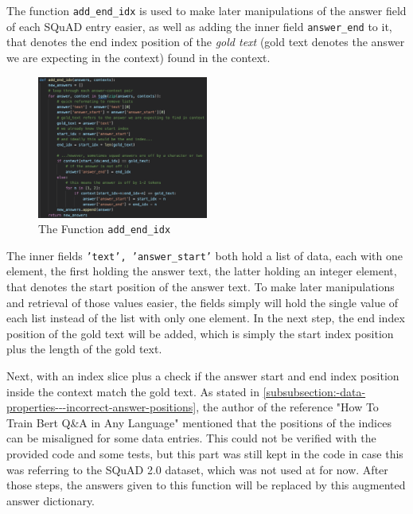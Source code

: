                 The function \texttt{add\_end\_idx} is used to make later manipulations of the answer field of each SQuAD entry easier, as well as adding the inner field \texttt{answer\_end} to it, that denotes the end index position of the \emph{gold text} (gold text denotes the answer we are expecting in the context) found in the context.
                \begin{figure}
                    \caption{The Function \texttt{add\_end\_idx}}
                    \begin{center}
                        \includegraphics[width=0.5\textwidth]{figures/add_end_idx_function.png}
                    \end{center}
                    \label{fig:-data-preprocessing-augmenting---preparing-data-with-add-end-idx-function}
                \end{figure}
                The inner fields \texttt{'text', 'answer\_start'} both hold a list of data, each with one element, the first holding the answer text, the latter holding an integer element, that denotes the start position of the answer text. To make later manipulations and retrieval of those values easier, the fields simply will hold the single value of each list instead of the list with only one element.
                In the next step, the end index position of the gold text will be added, which is simply the start index position plus the length of the gold text.

                Next, with an index slice plus a check if the answer start and end index position inside the context match the gold text.
                As stated in \ref{subsubsection:-data-properties---incorrect-answer-positions}, the author of the reference "How To Train Bert Q\&A in Any Language"\cite{bertTorwardsDataScience} mentioned that the positions of the indices can be misaligned for some data entries. 
                This could not be verified with the provided code and some tests, but this part was still kept in the code in case this was referring to the SQuAD 2.0 dataset, which was not used at for now.
                After those steps, the answers given to this function will be replaced by this augmented answer dictionary.


